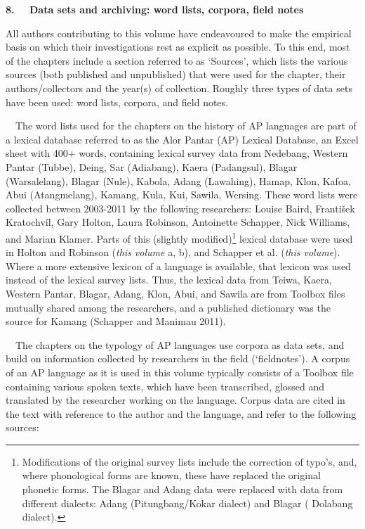 {\bfseries
8. \ \ Data sets and archiving: word lists, corpora, field notes}

All authors contributing to this volume have endeavoured to make the empirical basis on which their investigations rest as explicit as possible. To this end, most of the chapters include a section referred to as {\textquoteleft}Sources{\textquoteright}, which lists the various sources (both published and unpublished) that were used for the chapter, their authors/collectors and the year(s) of collection. Roughly three types of data sets have been used: word lists, corpora, and field notes. 

\ \ The word lists used for the chapters on the history of AP languages are part of a lexical database referred to as the Alor Pantar (AP) Lexical Database, an Excel sheet with 400+ words, containing lexical survey data from Nedebang, Western Pantar (Tubbe), Deing, Sar (Adiabang), Kaera (Padangsul), Blagar (Warsalelang), Blagar (Nule), Kabola, Adang (Lawahing), Hamap, Klon, Kafoa, Abui (Atangmelang), Kamang, Kula, Kui, Sawila, Wersing. These word lists were collected between 2003-2011 by the following researchers: Louise Baird, Franti\v{s}ek Kratochv\'il, Gary Holton, Laura Robinson, Antoinette Schapper, Nick Williams, and Marian Klamer. Parts of this (slightly modified)\textstylefootnotereference{ }\footnote{Modifications of the original survey lists include the correction of typo{\textquoteright}s, and, where phonological forms are known, these have replaced the original phonetic forms. The Blagar and Adang data were replaced with data from different dialects: Adang (Pitungbang/Kokar dialect) and Blagar (
Dolabang dialect).} lexical database were used in Holton and Robinson (\textit{this volume} a, b), and Schapper et al. (\textit{this volume}). Where a more extensive lexicon of a language is available, that lexicon was used instead of the lexical survey lists. Thus, the lexical data from Teiwa, Kaera, Western Pantar, Blagar, Adang, Klon, Abui, and Sawila are from Toolbox files mutually shared among the researchers, and a published dictionary was the source for Kamang (Schapper and Manimau 2011).  

\ \ The chapters on the typology of AP languages use corpora as data sets, and build on information collected by researchers in the field ({\textquoteleft}fieldnotes{\textquoteright}). A corpus of an AP language as it is used in this volume typically consists of a Toolbox file containing various spoken texts, which have been transcribed, glossed and translated by the researcher working on the language. Corpus data are cited in the text with reference to the author and the language, and refer to the following sources: 

